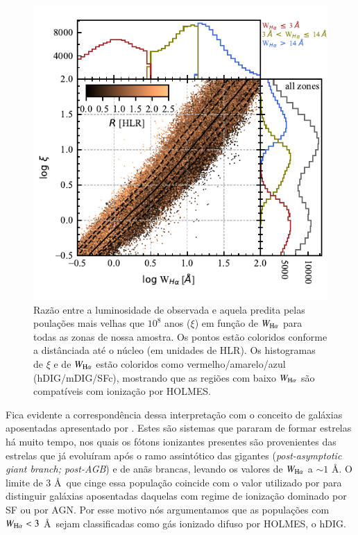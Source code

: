 
\begin{figure}
 \includegraphics[scale=1.5]{figuras/fig_logxi_logWHa_histograms.pdf}
 \caption[$\log \xi \times \log {\rm H}\alpha$]
 {Razão entre a luminosidade de \Ha observada e aquela predita pelas poulações mais velhas que $10^8$ anos ($\xi$) em função de $W_{\Ha}$ para todas as zonas de nossa amostra. Os pontos estão coloridos conforme a distânciada até o núcleo (em unidades de HLR). Os histogramas de $\xi$ e de $W_{\Ha}$ estão coloridos como vermelho/amarelo/azul (hDIG/mDIG/SFc), mostrando que as regiões com baixo $W_{\Ha}$ são compatíveis com ionização por HOLMES.}
 \label{fig:WHa-Xi}
\end{figure}

Fica evidente a correspondência dessa interpretação com o conceito de galáxias aposentadas apresentado por \citet{Stasinska.etal.2008a}. Estes são sistemas que pararam de formar estrelas há muito tempo, nos quais os fótons ionizantes presentes são provenientes das estrelas que já evoluíram após o ramo assintótico das gigantes ({\em post-asymptotic giant branch; post-AGB}) e de anãs brancas, levando os valores de $W_{\Ha}$ a $\sim 1$ \AA. O limite de 3 \AA\ que cinge essa população coincide com o valor utilizado por \citet{CidFernandes.etal.2011a} para distinguir galáxias aposentadas daquelas com regime de ionização dominado por SF ou por AGN. Por esse motivo nós argumentamos que as populações com $W_{\Ha} < 3$ \AA\ sejam classificadas como gás ionizado difuso por HOLMES, o hDIG.

